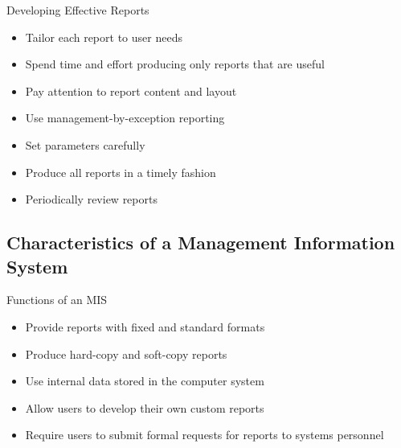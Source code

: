 \documentclass[\main/notes.tex]{subfiles}
\begin{document}
				\begin{sidenote}{Developing Effective Reports}
					\begin{multicols}{2}
						\begin{itemize}[nosep]
							\item Tailor each report to user needs
							\item Spend time and effort producing only reports that are useful
							\item Pay attention to report content and layout
							\item Use management-by-exception reporting
							\item Set parameters carefully
							\item Produce all reports in a timely fashion
							\item Periodically review reports
						\end{itemize}
					\end{multicols}
				\end{sidenote}
			\subsection{Characteristics of a Management Information System}
				\begin{sidenote}{Functions of an MIS}
					\begin{multicols}{2}
						\begin{itemize}[nosep]
							\item Provide reports with fixed and standard formats
							\item Produce hard-copy and soft-copy reports
							\item Use internal data stored in the computer system
							\item Allow users to develop their own custom reports
							\item Require users to submit formal requests for reports to systems personnel
						\end{itemize}
					\end{multicols}
				\end{sidenote}
	\vbox{}
\end{document}

